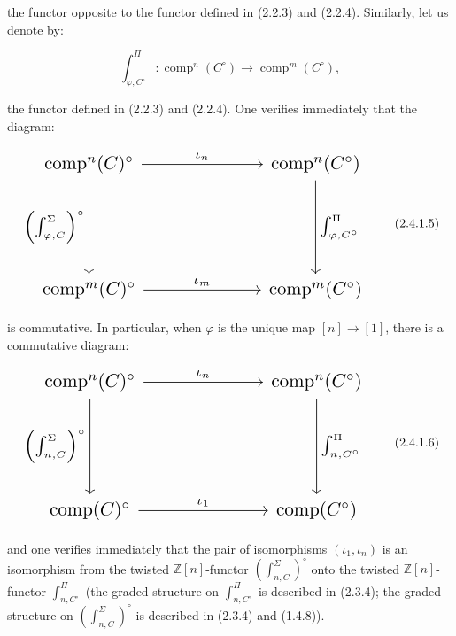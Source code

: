 %
the functor opposite to the functor defined in (2.2.3) and (2.2.4).
Similarly, let us denote by:

\begin{equation}
  \int_{\varphi,C^\circ}^{\Pi}\colon
  \operatorname{comp}^{n}(C^\circ)
  \longrightarrow
  \operatorname{comp}^{m}(C^\circ),
  \tag{2.4.1.4}
\end{equation}

the functor defined in (2.2.3) and (2.2.4). One verifies immediately that
the diagram:

\begin{equation}
  \resizebox{0.82\textwidth}{!}{%
    $\begin{tikzcd}[ampersand replacement=\&,column sep=6.5em,row sep=5.2em]
      \operatorname{comp}^{n}(C)^\circ
        \arrow[r,"\iota_n"]
        \arrow[d,"{\left(\int_{\varphi,C}^{\Sigma}\right)^\circ}"']
        \& \operatorname{comp}^{n}(C^\circ)
          \arrow[d,"{\int_{\varphi,C^\circ}^{\Pi}}"] \\
      \operatorname{comp}^{m}(C)^\circ
        \arrow[r,"\iota_m"]
        \& \operatorname{comp}^{m}(C^\circ)
    \end{tikzcd}$%
  }
  \tag{2.4.1.5}
\end{equation}

is commutative. In particular, when $\varphi$ is the unique map
$[n]\longrightarrow[1]$, there is a commutative diagram:

\begin{equation}
  \resizebox{0.82\textwidth}{!}{%
    $\begin{tikzcd}[ampersand replacement=\&,column sep=6.5em,row sep=5.2em]
      \operatorname{comp}^{n}(C)^\circ
        \arrow[r,"\iota_n"]
        \arrow[d,"{\left(\int_{n,C}^{\Sigma}\right)^\circ}"']
        \& \operatorname{comp}^{n}(C^\circ)
          \arrow[d,"{\int_{n,C^\circ}^{\Pi}}"] \\
      \operatorname{comp}(C)^\circ
        \arrow[r,"\iota_1"]
        \& \operatorname{comp}(C^\circ)
    \end{tikzcd}$%
  }
  \tag{2.4.1.6}
\end{equation}

and one verifies immediately that the pair of isomorphisms
$(\iota_1,\iota_n)$ is an isomorphism from the twisted
$\mathbb Z[n]$-functor $\left(\int_{n,C}^{\Sigma}\right)^\circ$ onto the
twisted $\mathbb Z[n]$-functor $\int_{n,C^\circ}^{\Pi}$ (the graded
structure on $\int_{n,C^\circ}^{\Pi}$ is described in (2.3.4); the graded
structure on $\left(\int_{n,C}^{\Sigma}\right)^\circ$ is described in
(2.3.4) and (1.4.8)).

